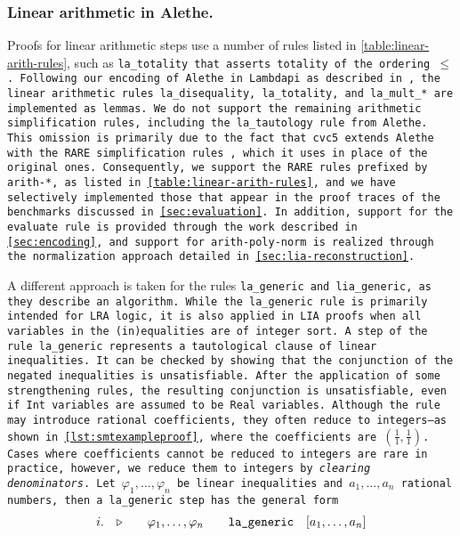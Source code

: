 \subsubsection{Linear arithmetic in Alethe.}
\label{sssect:la-in-alethe}

Proofs for linear arithmetic steps use a number of rules listed in \cref{table:linear-arith-rules}, such as \tt{la\_totality} that asserts totality of the ordering $\leq$.
Following our encoding of Alethe in Lambdapi as described in \cite{ColtellacciMD24}, the linear arithmetic rules \tt{la\_disequality}, \tt{la\_totality}, and \tt{la\_mult\_*} are implemented as lemmas.
We do not support the remaining arithmetic simplification rules, including the \tt{la\_tautology} rule from Alethe.
This omission is primarily due to the fact that cvc5 extends Alethe with the RARE simplification rules \cite{rare}, which it uses in place of the original ones.
Consequently, we support the RARE rules prefixed by \tt{arith-*}, as listed in \cref{table:linear-arith-rules}, and we have selectively implemented those that appear in the proof traces of the benchmarks discussed in \cref{sec:evaluation}.
In addition, support for the \tt{evaluate} rule is provided through the work described in \cref{sec:encoding}, and support for \tt{arith-poly-norm} is realized through the normalization approach detailed in \cref{sec:lia-reconstruction}.

A different approach is taken for the rules \tt{la\_generic} and \tt{lia\_generic}, as they describe an algorithm.
While the \tt{la\_generic rule} is primarily intended for LRA logic, it is also applied in LIA proofs when all variables in the (in)equalities are of integer sort.
A step of the rule \tt{la\_generic} represents a tautological clause of linear inequalities.  It can be checked by showing that the conjunction of
the negated inequalities is unsatisfiable. After the application of some strengthening rules, the resulting conjunction is unsatisfiable,
even if \lstinline[language=SMT,basicstyle=\ttfamily\footnotesize\upshape]{Int} variables are assumed to be \lstinline[language=SMT,basicstyle=\ttfamily\footnotesize\upshape]{Real} variables.
Although the rule may introduce rational coefficients, they often reduce to integers—as shown in \cref{lst:smtexampleproof}, where the coefficients are $(\frac{1}{1}, \frac{1}{1})$.
Cases where coefficients cannot be reduced to integers are rare in practice, however, we reduce them to integers by \emph{clearing denominators}.
Let $\varphi_1,\dots, \varphi_n$ be linear inequalities and $a_1, \dots, a_n$ rational numbers, then a \tt{la\_generic} step has the general form
%
\[
\begin{matrix*}[c]
  i. & \ctxsep \quad & \varphi_1 , \dots , \varphi_n & \quad \tt{la\_generic}  & [a_1, \dots, a_n] \\
\end{matrix*}
\]

